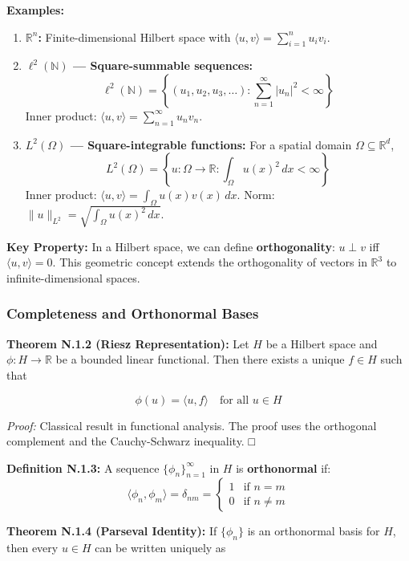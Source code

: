 \documentclass[
]{article}
\begin{document}
\textbf{Examples:}

\begin{enumerate}
\def\labelenumi{\arabic{enumi}.}
\item
  \textbf{\(\mathbb{R}^n\):} Finite-dimensional Hilbert space with
  \(\langle u, v \rangle = \sum_{i=1}^n u_i v_i\).
\item
  \textbf{\(\ell^2(\mathbb{N})\) --- Square-summable sequences:}
  \[\ell^2(\mathbb{N}) = \left\{ (u_1, u_2, u_3, \ldots) : \sum_{n=1}^\infty |u_n|^2 < \infty \right\}\]
  Inner product: \(\langle u, v \rangle = \sum_{n=1}^\infty u_n v_n\).
\item
  \textbf{\(L^2(\Omega)\) --- Square-integrable functions:} For a
  spatial domain \(\Omega \subseteq \mathbb{R}^d\),
  \[L^2(\Omega) = \left\{ u: \Omega \to \mathbb{R} : \int_\Omega u(x)^2\,dx < \infty \right\}\]
  Inner product: \(\langle u, v \rangle = \int_\Omega u(x)v(x)\,dx\).
  Norm: \(\|u\|_{L^2} = \sqrt{\int_\Omega u(x)^2\,dx}\).
\end{enumerate}

\textbf{Key Property:} In a Hilbert space, we can define
\textbf{orthogonality}: \(u \perp v\) iff \(\langle u, v \rangle = 0\).
This geometric concept extends the orthogonality of vectors in
\(\mathbb{R}^3\) to infinite-dimensional spaces.

\subsubsection{Completeness and Orthonormal
Bases}\label{completeness-and-orthonormal-bases}

\textbf{Theorem N.1.2 (Riesz Representation):} Let \(H\) be a Hilbert
space and \(\phi: H \to \mathbb{R}\) be a bounded linear functional.
Then there exists a unique \(f \in H\) such that

\[\phi(u) = \langle u, f \rangle \quad \text{for all } u \in H\]

\emph{Proof:} Classical result in functional analysis. The proof uses
the orthogonal complement and the Cauchy-Schwarz inequality. □

\textbf{Definition N.1.3:} A sequence \(\{\phi_n\}_{n=1}^\infty\) in
\(H\) is \textbf{orthonormal} if:
\[\langle \phi_n, \phi_m \rangle = \delta_{nm} = \begin{cases} 1 & \text{if } n = m \\ 0 & \text{if } n \neq m \end{cases}\]

\textbf{Theorem N.1.4 (Parseval Identity):} If \(\{\phi_n\}\) is an
orthonormal basis for \(H\), then every \(u \in H\) can be written
uniquely as
\end{document}
